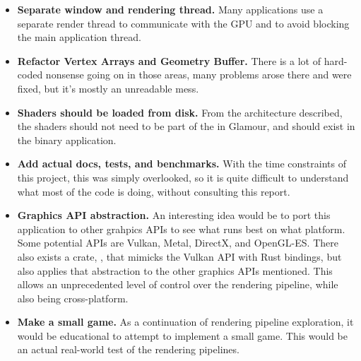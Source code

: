 \begin{itemize}
  \item \textbf{Separate window and rendering thread.} Many applications use a separate render thread to communicate with the GPU and to avoid blocking the main application thread.
  \item \textbf{Refactor Vertex Arrays and Geometry Buffer.} There is a lot of hard-coded nonsense going on in those areas, many problems arose there and were fixed, but it's mostly an unreadable mess.
  \item \textbf{Shaders should be loaded from disk.} From the architecture described, the shaders should not need to be part of the  in Glamour, and should exist in the binary application.
  \item \textbf{Add actual docs, tests, and benchmarks.} With the time constraints of this project, this was simply overlooked, so it is quite difficult to understand what most of the code is doing, without consulting this report.
  \item \textbf{Graphics API abstraction.} An interesting idea would be to port this application to other grahpics APIs to see what runs best on what platform. Some potential APIs are Vulkan, Metal, DirectX, and OpenGL-ES. There also exists a crate, , that mimicks the Vulkan API with Rust bindings, but also applies that abstraction to the other graphics APIs mentioned. This allows an unprecedented level of control over the rendering pipeline, while also being cross-platform.
  \item \textbf{Make a small game.} As a continuation of rendering pipeline exploration, it would be educational to attempt to implement a small game. This would be an actual real-world test of the rendering pipelines.
\end{itemize}

\newpage


\printbibliography[heading=bibintoc]{}

\newpage



